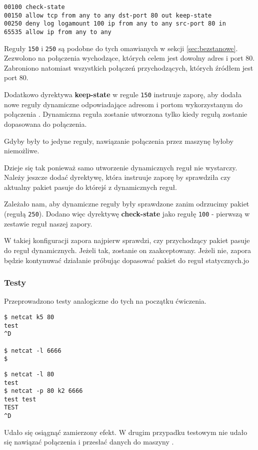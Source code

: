 \begin{lstlisting}
00100 check-state
00150 allow tcp from any to any dst-port 80 out keep-state
00250 deny log logamount 100 ip from any to any src-port 80 in
65535 allow ip from any to any
\end{lstlisting}

Reguły \texttt{150} i \texttt{250} są podobne do tych omawianych w sekcji \ref{sec:bezstanowe}.
Zezwolono na połączenia \tcp{} wychodzące, których celem jest dowolny adres i port 80.
Zabroniono natomiast wszystkich połączeń przychodzących, których źródłem jest port 80.

Dodatkowo dyrektywa \textbf{keep-state} w regule \texttt{150} instruuje zaporę, aby dodała nowe reguły dynamiczne odpowiadające adresom i portom wykorzystanym do połączenia \cite{bsd:firewall}.
Dynamiczna reguła zostanie utworzona tylko kiedy regułą zostanie dopasowana do połączenia.

Gdyby były to jedyne reguły, nawiązanie połączenia \tcp{} przez maszynę \kdwa{} byłoby niemożliwe.

Dzieje się tak ponieważ samo utworzenie dynamicznych reguł nie wystarczy.
Należy jeszcze dodać dyrektywę, która instruuje zaporę by sprawdziła czy aktualny pakiet pasuje do którejś z dynamicznych reguł.

Zależało nam, aby dynamiczne reguły były sprawdzone zanim odrzucimy pakiet (regułą \texttt{250}).
Dodano więc dyrektywę \textbf{check-state} jako regułę \texttt{100} - pierwszą w zestawie reguł naszej zapory.

W takiej konfiguracji zapora najpierw sprawdzi, czy przychodzący pakiet pasuje do reguł dynamicznych.
Jeżeli tak, zostanie on zaakceptowany.
Jeżeli nie, zapora będzie kontynuwać działanie próbując dopasować pakiet do reguł statycznych.jo

\subsubsection{Testy}
Przeprowadzono testy analogiczne do tych na początku ćwiczenia.

\begin{minipage}[b]{0.4\linewidth}
\begin{lstlisting}[caption={\kdwa{}}]
$ netcat k5 80
test
^D

$ netcat -l 6666
$
\end{lstlisting}
\end{minipage}
\begin{minipage}[b]{0.12\linewidth}
  \hfill\vspace{1cm}
\end{minipage}
\begin{minipage}[b]{0.4\linewidth}
\begin{lstlisting}[caption={\kpiec{}}]
$ netcat -l 80
test
$ netcat -p 80 k2 6666
test test
TEST
^D
\end{lstlisting}
\end{minipage}

Udało się osiągnąć zamierzony efekt.
W drugim przypadku testowym nie udało się nawiązać połączenia i przesłać danych do maszyny \kdwa{}.
